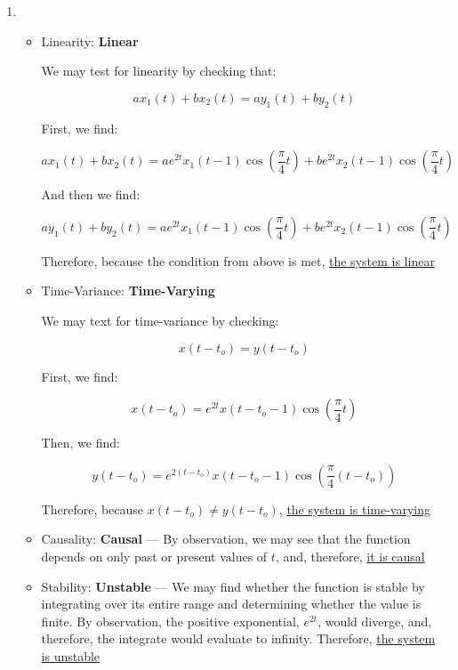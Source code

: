 \begin{enumerate}[label=\textbf{\Roman*}.]

  \item

    \begin{itemize}

      \item Linearity: \textbf{Linear}

        We may test for linearity by checking that:

        $$ax_1(t)+bx_2(t)=ay_1(t)+by_2(t)$$

        First, we find:

        $$ax_1(t)+bx_2(t)=ae^{2t}x_1(t-1)\cos\left( \frac{\pi}{4}t \right)+be^{2t}x_2(t-1)\cos\left( \frac{\pi}{4}t \right)$$

        And then we find:

        $$ay_1(t)+by_2(t)=ae^{2t}x_1(t-1)\cos\left( \frac{\pi}{4}t \right)+be^{2t}x_2(t-1)\cos\left( \frac{\pi}{4}t \right)$$

        Therefore, because the condition from above is met, \underline{the system is linear}

      \item Time-Variance: \textbf{Time-Varying}

        We may text for time-variance by checking:

        $$x(t-t_o)=y(t-t_o)$$

        First, we find:

        $$x(t-t_o)=e^{2t}x(t-t_o-1)\cos\left( \frac{\pi}{4}t \right)$$

        Then, we find:

        $$y(t-t_o)=e^{2(t-t_o)}x(t-t_o-1)\cos\left( \frac{\pi}{4}(t-t_o) \right)$$

        Therefore, because $x(t-t_o)\neq y(t-t_o)$, \underline{the system is time-varying}

      \item Causality: \textbf{Causal} — By observation, we may see that the function depends on only past or present values of $t$, and, therefore, \underline{it is causal}

      \item Stability: \textbf{Unstable} — We may find whether the function is stable by integrating over its entire range and determining whether the value is finite. By observation, the positive exponential, $e^{2t}$, would diverge, and, therefore, the integrate would evaluate to infinity. Therefore, \underline{the system is unstable}


\end{itemize}
\end{enumerate}

